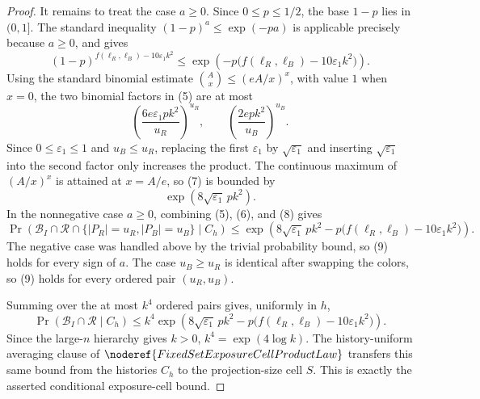 \begin{proof}
It remains to treat the case \(a\ge0\).  Since \(0\le p\le1/2\), the base
\(1-p\) lies in \((0,1]\).  The standard inequality
\((1-p)^a\le\exp(-pa)\) is applicable precisely because \(a\ge0\), and gives
\[
(1-p)^{f(\ell_R,\ell_B)-10\varepsilon_1k^2}
\le
\exp\!\left(-p\bigl(f(\ell_R,\ell_B)-10\varepsilon_1k^2\bigr)\right).
\tag{6}
\]
Using the standard binomial estimate
\(\binom Ax\le(eA/x)^x\), with value \(1\) when \(x=0\), the two binomial
factors in (5) are at most
\[
\left(\frac{6e\varepsilon_1pk^2}{u_R}\right)^{u_R},
\qquad
\left(\frac{2epk^2}{u_B}\right)^{u_B}.
\tag{7}
\]
Since \(0\le\varepsilon_1\le1\) and \(u_B\le u_R\), replacing the first
\(\varepsilon_1\) by \(\sqrt{\varepsilon_1}\) and inserting
\(\sqrt{\varepsilon_1}\) into the second factor only increases the product.
The continuous maximum of \((A/x)^x\) is attained at \(x=A/e\), so (7) is
bounded by
\[
\exp(8\sqrt{\varepsilon_1}\,pk^2). \tag{8}
\]
In the nonnegative case \(a\ge0\), combining (5), (6), and (8) gives
\[
\Pr(\mathcal B_I\cap\mathcal R\cap\{|P_R|=u_R,|P_B|=u_B\}\mid C_h)
\le
\exp\!\left(
8\sqrt{\varepsilon_1}\,pk^2
-p\bigl(f(\ell_R,\ell_B)-10\varepsilon_1k^2\bigr)
\right). \tag{9}
\]
The negative case was handled above by the trivial probability bound, so
(9) holds for every sign of \(a\).
The case \(u_B\ge u_R\) is identical after swapping the colors, so (9) holds
for every ordered pair \((u_R,u_B)\).

Summing over the at most \(k^4\) ordered pairs gives, uniformly in \(h\),
\[
\Pr(\mathcal B_I\cap\mathcal R\mid C_h)
\le
k^4
\exp\!\left(
8\sqrt{\varepsilon_1}\,pk^2
-p\bigl(f(\ell_R,\ell_B)-10\varepsilon_1k^2\bigr)
\right).
\]
Since the large-\(n\) hierarchy gives \(k>0\), \(k^4=\exp(4\log k)\).  The
history-uniform averaging clause of
\(\noderef{FixedSetExposureCellProductLaw}\) transfers this same bound from
the histories \(C_h\) to the projection-size cell \(S\).  This is exactly the
asserted conditional exposure-cell bound.
\end{proof}
